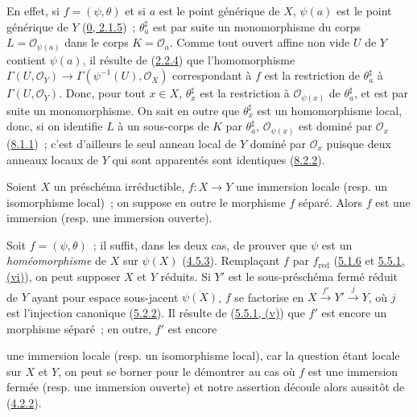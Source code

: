 En effet, si $f=(\psi,\theta)$ et si $a$ est le point générique de $X$,
$\psi(a)$ est le point générique de $Y$
(\hyperref[0.2.1.5-fr]{0, 2.1.5})~; $\theta_a^\sharp$ est par suite un
monomorphisme du corps $L=\mathscr{O}_{\psi(a)}$ dans le corps
$K=\mathscr{O}_a$. Comme tout ouvert affine non vide $U$ de $Y$ contient
$\psi(a)$, il résulte de (\hyperref[I.2.2.4-fr]{2.2.4}) que l'homomorphisme
$\Gamma(U,\mathscr{O}_Y)\to\Gamma(\psi^{-1}(U),\mathscr{O}_X)$ correspondant
à $f$ est la restriction de $\theta_a^\sharp$ à
$\Gamma(U,\mathscr{O}_Y)$. Donc, pour tout $x\in X$,
$\theta_x^\sharp$ est la restriction à $\mathscr{O}_{\psi(x)}$ de
$\theta_a^\sharp$, et est par suite un monomorphisme. On sait en outre que
$\theta_x^\sharp$ est un homomorphisme local, donc, si on identifie $L$ à un
sous-corps de $K$ par $\theta_a^\sharp$, $\mathscr{O}_{\psi(x)}$ est dominé
par $\mathscr{O}_x$ (\hyperref[I.8.1.1-fr]{8.1.1})~; c'est d'ailleurs le seul
anneau local de $Y$ dominé par $\mathscr{O}_x$ puisque deux anneaux locaux de
$Y$ qui sont apparentés sont identiques
(\hyperref[I.8.2.2-fr]{8.2.2}).

\begin{proposition}[8.2.8]
\label{I.8.2.8-fr}
Soient $X$ un préschéma irréductible, $f:X\to Y$ une immersion locale
(resp. un isomorphisme local)~; on suppose en outre le morphisme $f$ séparé.
Alors $f$ est une immersion (resp. une immersion ouverte).
\end{proposition}

Soit $f=(\psi,\theta)$~; il suffit, dans les deux cas, de prouver que $\psi$
est un \emph{homéomorphisme} de $X$ sur $\psi(X)$
(\hyperref[I.4.5.3-fr]{4.5.3}). Remplaçant $f$ par $f_{\mathrm{red}}$
(\hyperref[I.5.1.6-fr]{5.1.6} et
\hyperref[I.5.5.1-fr]{5.5.1, (vi)}), on peut supposer $X$ et $Y$ réduits. Si
$Y'$ est le sous-préschéma fermé réduit de $Y$ ayant pour espace sous-jacent
$\overline{\psi(X)}$, $f$ se factorise en
$X\xrightarrow{f'}Y'\xrightarrow{j}Y$, où $j$ est l'injection canonique
(\hyperref[I.5.2.2-fr]{5.2.2}). Il résulte de
(\hyperref[I.5.5.1-fr]{5.5.1, (v)}) que $f'$ est encore un morphisme séparé~;
en outre, $f'$ est encore

une immersion locale (resp. un isomorphisme local), car la question étant
locale sur $X$ et $Y$, on peut se borner pour le démontrer au cas où $f$ est
une immersion fermée (resp. une immersion ouverte) et notre assertion découle
alors aussitôt de (\hyperref[I.4.2.2-fr]{4.2.2}).

